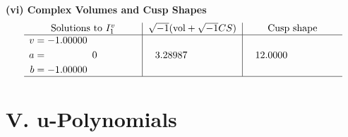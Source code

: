 \documentclass[1p]{elsarticle_modified}
\theoremstyle{definition}
\newcommand{\I}{\sqrt{-1}}
\begin{document}
\newpage\flushleft \textbf{(vi) Complex Volumes and Cusp Shapes}
$$\begin{array}{c|c|c}  
\text{Solutions to }I^v_{1}& \I (\text{vol} + \sqrt{-1}CS) & \text{Cusp shape}\\
 \hline 
\begin{aligned}
v &= -1.00000\phantom{ +0.000000I} \\
a &= \phantom{-0.000000 } 0 \\
b &= -1.00000\phantom{ +0.000000I}\end{aligned}
 & \phantom{-}3.28987\phantom{ +0.000000I} & \phantom{-}12.0000\phantom{ +0.000000I}\\
 \hline 
 \end{array}$$\newpage
\newpage\renewcommand{\arraystretch}{1}
\centering \section*{ V. u-Polynomials}
\end{document}
